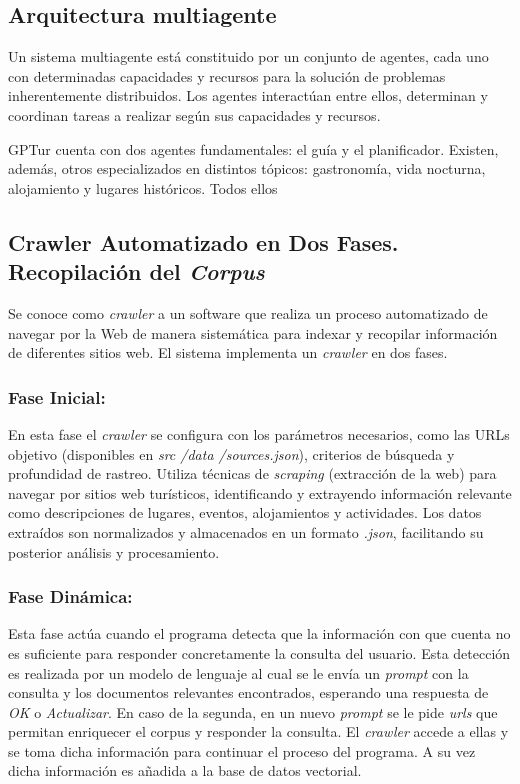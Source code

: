 \documentclass[10pt]{llncs}
\begin{document}
\vspace{\baselineskip}
\subsection{Arquitectura multiagente}

Un sistema multiagente está constituido por un conjunto de agentes, cada uno con determinadas capacidades y recursos para la solución de problemas inherentemente distribuidos. Los agentes interactúan entre ellos, determinan y coordinan tareas a realizar según sus capacidades y recursos.

GPTur cuenta con dos agentes fundamentales: el guía y el planificador. Existen, además, 
otros especializados en distintos tópicos: gastronomía, vida nocturna, alojamiento y lugares históricos. Todos ellos 

\vspace{\baselineskip}
\subsection{Crawler Automatizado en Dos Fases. Recopilación del \textit{Corpus}}

Se conoce como \textit{crawler} a un software que realiza un proceso automatizado de navegar por la Web de manera sistemática para indexar y recopilar
información de diferentes sitios web. El sistema implementa un \textit{crawler} en dos fases.

\subsubsection{Fase Inicial:} En esta fase el \textit{crawler} se configura con los parámetros necesarios, como las URLs objetivo (disponibles en \textit{src /data /sources.json}), 
criterios de búsqueda y profundidad de rastreo. Utiliza técnicas de \textit{scraping} (extracción de la web) para navegar por sitios web turísticos, identificando y extrayendo 
información relevante como descripciones de lugares, eventos, alojamientos y actividades. Los datos extraídos son normalizados y almacenados en un formato \textit{.json}, facilitando su posterior análisis y procesamiento.

\subsubsection{Fase Dinámica:} Esta fase actúa cuando el programa detecta que la información con que cuenta no es suficiente para responder concretamente la consulta del usuario. Esta detección es realizada por un modelo de 
lenguaje al cual se le envía un \textit{prompt} con la consulta y los documentos relevantes encontrados, esperando una respuesta de \textit{OK} o \textit{Actualizar}. En caso de la segunda, en un nuevo \textit{prompt} se le pide 
\textit{urls} que permitan enriquecer el corpus y responder la consulta. El \textit{crawler} accede a ellas y se toma dicha información para continuar el proceso del programa. A su vez dicha información es añadida a la base de datos 
vectorial.
\end{document}
